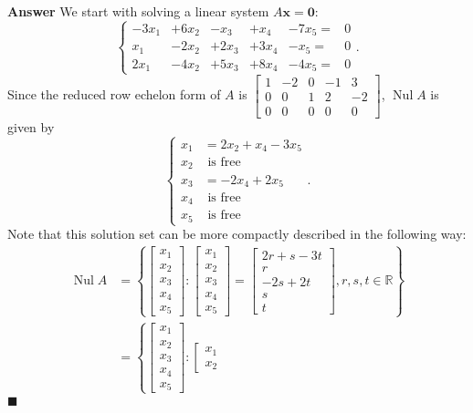 \documentclass[12pt,letterpaper]{book}
\numberwithin{equation}{section}
\theoremstyle{definition}
\newenvironment{answer}{\noindent\textbf{Answer}}{\hfill$\blacksquare$\vspace{0.1in}}
\newcommand{\vx}{\bm{x}}
\newcommand{\veczero}{\bm{0}}
\newcommand{\Nul}{\operatorname{Nul}}
\begin{document}
\begin{answer}
We start with solving a linear system $A\vx=\veczero$:
$$\left\{\begin{array}{rrrrrr}
-3x_1&+6x_2&-x_3&+x_4&-7x_5=&0 \\
x_1&-2x_2&+2x_3&+3x_4&-x_5=&0 \\
2x_1&-4x_2&+5x_3&+8x_4&-4x_5=&0
\end{array}\right. .$$
Since the reduced row echelon form of $A$ is $\left[\begin{array}{rrrrr} 1 & -2 & 0 & -1 & 3
\\ 0 & 0 & 1 & 2 & -2 \\ 0 & 0 & 0 & 0 & 0
\end{array}\right]$, $\Nul A$ is given by
$$\left\{\begin{array}{rl}x_1&=2x_2+x_4-3x_5 \\ x_2&\text{ is free} \\ x_3&=-2x_4+2x_5 \\ x_4&\text{ is free} \\ x_5&\text{ is free} \end{array}\right..$$
Note that this solution set can be more compactly described in the following way:
\begin{align*}\Nul A&=\left\{\left[\begin{array}{r} x_1 \\ x_2
\\ x_3 \\ x_4 \\ x_5 \end{array}\right]:  \left[\begin{array}{r} x_1 \\ x_2
\\ x_3 \\ x_4 \\ x_5 \end{array}\right]=\left[\begin{array}{c} 2r+s-3t \\ r
\\ -2s+2t \\ s \\ t \end{array}\right], r,s,t\in \mathbb{R} \right\}\\
&=\left\{\left[\begin{array}{r} x_1 \\ x_2
\\ x_3 \\ x_4 \\ x_5 \end{array}\right]:  \left[\begin{array}{r} x_1 \\ x_2

\end{array}
\end{align*}
\end{answer}
\end{document}
